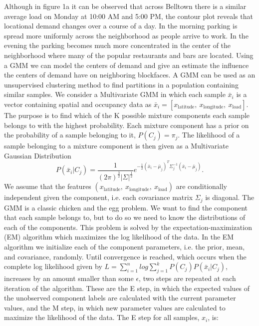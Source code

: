 \documentclass{article}
\begin{document}
\noindent
Although in figure 1a it can be observed that across Belltown there is a similar average load on Monday at 10:00 AM and 5:00 PM, the contour plot reveals that locational demand changes over a course of a day. In the morning parking is spread more uniformly across the neighborhood as people arrive to work. In the evening the parking becomes much more concentrated in the center of the neighborhood where many of the popular restaurants and bars are located.
\newline
\indent
Using a GMM we can model the centers of demand and give an estimate the influence the centers of demand have on neighboring blockfaces. A GMM can be used as an unsupervised clustering method to find partitions in a population containing similar samples. We consider a Multivariate GMM in which each sample $\bar{x}_i$ is a vector containing spatial and occupancy data as $\bar{x}_i = [x_{\text{latitude}}, \ x_{\text{longitude}}, \ x_{\text{load}}]$. The purpose is to find which of the K possible mixture components each sample belongs to with the highest probability. Each mixture component has a prior on the probability of a sample belonging to it, $P(C_j) = \pi_j$. The likelihood of a sample belonging to a mixture component is then given as a Multivariate Gaussian Distribution 
\begin{equation}
P(\bar{x}_i|C_j) = \frac{1}{(2 \pi)^{\frac{3}{2}}|\Sigma|^{\frac{1}{2}}}
e^{-\frac{1}{2}(\bar{x}_i - \bar{\mu}_j)^T\Sigma_j^{-1}(\bar{x}_i - \bar{\mu}_j)}.
\end{equation}
We assume that the features $(x_{\text{latitude}}, \ x_{\text{longitude}}, \ x_{\text{load}})$ are conditionally independent given the component, i.e. each covariance matrix $\Sigma_j$ is diagonal. The GMM is a classic chicken and the egg problem. We want to find the component that each sample belongs to, but to do so we need to know the distributions of each of the components. This problem is solved by the expectation-maximization (EM) algorithm which maximizes the log likelihood of the data. In the EM algorithm we initialize each of the component parameters, i.e. the prior, mean, and covariance, randomly. Until convergence is reached, which occurs when the complete log likelihood given by $L = \sum_{i=1}^n log \sum_{j=1}^k P(C_j)P(\bar{x}_i|C_j)$, increases by an amount smaller than some $\epsilon$, two steps are repeated at each iteration of the algorithm. These are the E step, in which the expected values of the unobserved component labels are calculated with the current parameter values, and the M step, in which new parameter values are calculated to maximize the likelihood of the data. The E step for all samples, $x_i$, is:
\end{document}
